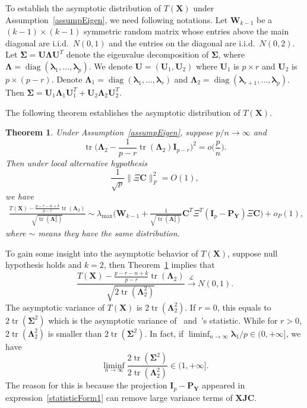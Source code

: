 \documentclass[12pt]{article} %
\DeclareMathOperator{\mytr}{tr}
\DeclareMathOperator{\mydiag}{diag}
\newcommand{\bX}{\mathbf{X}}
\newcommand{\bP}{\mathbf{P}}
\newcommand{\bY}{\mathbf{Y}}
\newcommand{\bJ}{\mathbf{J}}
\newcommand{\bC}{\mathbf{C}}
\newcommand{\bI}{\mathbf{I}}
\newcommand{\bU}{\mathbf{U}}
\newcommand{\bW}{\mathbf{W}}
\newcommand{\bfsym}[1]{\ensuremath{\boldsymbol{#1}}}
\def\blambda {\bfsym {\lambda}}
\def\bLambda {\bfsym {\Lambda}}
\def\bSigma {\bfsym {\Sigma}}
\newtheorem{theorem}{Theorem}
\theoremstyle{definition}
\begin{document}
To establish the asymptotic distribution of $T(\bX)$ under Assumption~\ref{assumpEigen},
we need following notations.
Let $\bW_{k-1}$ be a $(k-1)\times(k-1)$ symmetric random matrix whose entries above the main diagonal are i.i.d.\ $N(0,1)$ and the entries on the diagonal are i.i.d.\ $N(0,2)$.
Let $\bSigma= \bU\bLambda \bU^T$ denote the eigenvalue decomposition of $\bSigma$, where $\bLambda =\mydiag (\blambda_1,\ldots,\blambda_p)$.
We denote $\bU=(\bU_1,\bU_2)$ where $\bU_1$ is $p\times r$ and $\bU_2$ is $p\times (p-r)$.
Denote $\bLambda_1=\mydiag(\blambda_1,\ldots,\blambda_r)$ and $\bLambda_2=\mydiag(\blambda_{r+1},\ldots,\blambda_p)$.
Then $\bSigma=\bU_1\bLambda_1 \bU_1^T+\bU_2\bLambda_2 \bU_2^T$.

The following theorem establishes the asymptotic distribution of $T(\bX)$.
\begin{theorem}\label{thm1}
    Under Assumption~\ref{assumpEigen}, suppose $p/n\to \infty$ and
    $$
    \mytr\Big(\bLambda_2-\frac{1}{p-r}\mytr (\bLambda_2)\bI_{p-r}\Big)^2=o\big(\frac{p}{n}\big).
    $$
    Then under local alternative hypothesis
    \begin{equation*}
        \frac{1}{\sqrt{p}}\|\Xi \bC\|_F^2=O(1),
    \end{equation*}
    we have
    $$
    \begin{aligned}
        \frac{T(\bX)-\frac{p-r-n+k}{p-r}\mytr(\bLambda_2)}{\sqrt{\mytr (\bLambda_2^2)}}
        \sim
        \lambda_{\max}\Big(\bW_{k-1}+\tfrac{1}{\sqrt{\mytr(\bLambda_2^2)}} \bC^T \Xi^T (\bI_p-\bP_{\bY})\Xi \bC\Big)
        +o_P(1),
    \end{aligned}
    $$
    where $\sim$ means they have the same distribution.
\end{theorem}
To gain some insight into the asymptotic behavior of $T(\bX)$, suppose null hypothesis holds and $k=2$, then Theorem~\ref{thm1} implies that
$$
        \frac{T(\bX)-\frac{p-r-n+k}{p-r}\mytr(\bLambda_2)}{\sqrt{2\mytr (\bLambda_2^2)}}\xrightarrow{\mathcal{L}}N(0,1).
$$
The asymptotic variance of $T(\bX)$ is ${2\mytr (\bLambda_2^2)}$.
If $r=0$, this equals to ${2\mytr (\bSigma^2)}$ which is the asymptotic variance of~\citet{Bai1996Efiect} and~\citet{Chen2010A}'s statistic.
While for $r>0$, ${2\mytr (\bLambda_2^2)}$ is smaller than $2\mytr(\bSigma^2)$.
In fact, if $\liminf_{n\to \infty} \blambda_1/p \in (0,+\infty]$, we have
$$
\liminf_{n\to \infty}\frac{2\mytr(\bSigma^2)}{2\mytr(\bLambda_2^2)}\in (1,+\infty].
$$
The reason for this is because the projection $\bI_p-\bP_{\bY}$ appeared in expression~\eqref{statisticForm1} can remove large variance terms of $\bX\bJ \bC$.
\end{document}
